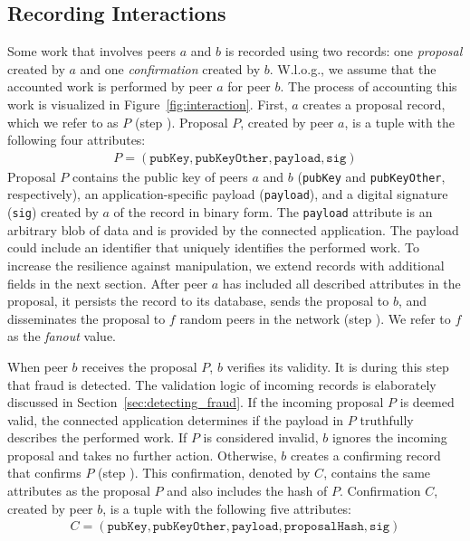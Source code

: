\subsection{Recording Interactions}
\label{sec:recording_interactions}
Some work that involves peers $ a $ and $ b $ is recorded using two records: one \emph{proposal} created by $ a $ and one \emph{confirmation} created by $ b $.
W.l.o.g., we assume that the accounted work is performed by peer $ a $ for peer $ b $.
The process of accounting this work is visualized in Figure~\ref{fig:interaction}.
First, $ a $ creates a proposal record, which we refer to as $ P $ (step ).
Proposal $ P $, created by peer $ a $, is a tuple with the following four attributes:
\begin{align*}
	P = (\texttt{pubKey}, \texttt{pubKeyOther}, \texttt{payload}, \texttt{sig})
\end{align*}
Proposal $ P $ contains the public key of peers $ a $ and $ b $ (\texttt{pubKey} and \texttt{pubKeyOther}, respectively), an application-specific payload (\texttt{payload}), and a digital signature (\texttt{sig}) created by $ a $ of the record in binary form.
The \texttt{payload} attribute is an arbitrary blob of data and is provided by the connected application.
The payload could include an identifier that uniquely identifies the performed work.
To increase the resilience against manipulation, we extend records with additional fields in the next section.
After peer $ a $ has included all described attributes in the proposal, it persists the record to its database, sends the proposal to $ b $, and disseminates the proposal to $ f $ random peers in the network (step ).
We refer to $ f $ as the \emph{fanout} value.

When peer $ b $ receives the proposal $ P $, $ b $ verifies its validity.
It is during this step that fraud is detected.
The validation logic of incoming records is elaborately discussed in Section~\ref{sec:detecting_fraud}.
If the incoming proposal $ P $ is deemed valid, the connected application determines if the payload in $ P $ truthfully describes the performed work.
If $ P $ is considered invalid, $ b $ ignores the incoming proposal and takes no further action.
Otherwise, $ b $ creates a confirming record that confirms $ P $ (step ).
This confirmation, denoted by $ C $, contains the same attributes as the proposal $ P $ and also includes the hash of $ P $.
Confirmation $ C $, created by peer $ b $, is a tuple with the following five attributes:
\begin{align*}
	C = (\texttt{pubKey}, \texttt{pubKeyOther}, \texttt{payload}, \texttt{proposalHash}, \texttt{sig})
\end{align*}

